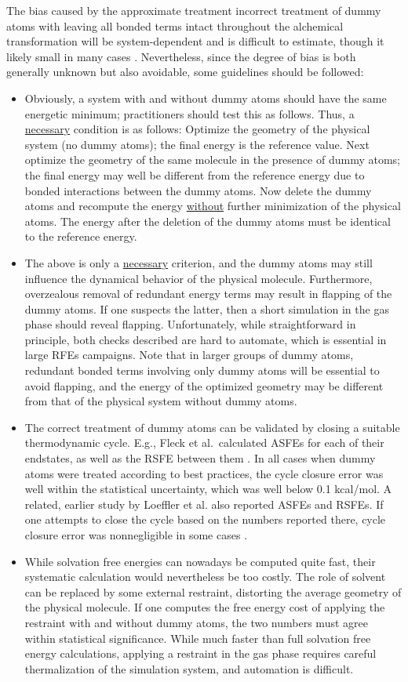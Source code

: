\documentclass[9pt,bestpractices]{livecoms}
\begin{document}
The bias caused by the approximate treatment incorrect treatment of dummy atoms with leaving all bonded terms intact throughout the alchemical transformation will be system-dependent and is difficult to estimate, though it likely small in many cases \cite{Fleck_2021}. Nevertheless, since the degree of bias is both generally unknown but also avoidable, some guidelines should be followed:
\begin{itemize}
  \item Obviously, a system with and without dummy atoms should have the same energetic minimum; practitioners should test this as follows. Thus, a \underline{necessary} condition is as follows: Optimize the geometry of the physical system (no dummy atoms); the final energy is the reference value. Next optimize the geometry of the same molecule in the presence of dummy atoms; the final energy may well be different from the reference energy due to bonded interactions between the dummy atoms. Now delete the dummy atoms and recompute the energy \underline{without} further minimization of the physical atoms. The energy after the deletion of the dummy atoms must be identical to the reference energy. 
\item The above is only a \underline{necessary} criterion, and the dummy atoms may still influence the dynamical behavior of the physical molecule. Furthermore, overzealous removal of redundant energy terms may result in flapping of the dummy atoms. If one suspects the latter, then a short simulation in the gas phase should reveal flapping. Unfortunately, while straightforward in principle, both checks described are hard to automate, which is essential in large RFEs campaigns.  Note that in larger groups of dummy atoms, redundant bonded terms involving only dummy atoms will be essential to avoid flapping, and the energy of the optimized geometry may be different from that of the physical system without dummy atoms. 
\item The correct treatment of dummy atoms can be validated by closing a suitable thermodynamic cycle.  E.g., Fleck et al.\ calculated ASFEs for each of their endstates, as well as the RSFE between them \cite{Fleck_2021}. In all cases when dummy atoms were treated according to best practices, the cycle closure error was well within the statistical uncertainty, which was well below 0.1 kcal/mol. A related, earlier study by Loeffler et al. also reported ASFEs and RSFEs. If one attempts to close the cycle based on the numbers reported there, cycle closure error was nonnegligible in some cases \cite{loeffler2018reproducibility}. 
\item While solvation free energies can nowadays be computed quite fast, their systematic calculation would nevertheless be too costly. The role of solvent can be replaced by some external restraint, distorting the average geometry of the physical molecule. If one computes the free energy cost of applying the restraint with and without dummy atoms, the two numbers must agree within statistical significance. While much faster than full solvation free energy calculations, applying a restraint in the gas phase requires careful thermalization of the simulation system, and automation is difficult.
  \end{itemize}
\end{document}
